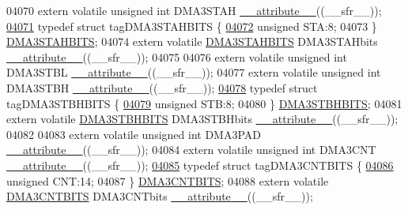 \begin{DoxyCode}
04070 \textcolor{keyword}{extern} \textcolor{keyword}{volatile} \textcolor{keywordtype}{unsigned} \textcolor{keywordtype}{int}  DMA3STAH \hyperlink{a00009_a493c46f03454991ccc5aa7a6e1dfb2a7}{\_\_attribute\_\_}((\_\_sfr\_\_));
\hypertarget{a00009_source_l04071}{}\hyperlink{a00008}{04071} \textcolor{keyword}{typedef} \textcolor{keyword}{struct }tagDMA3STAHBITS \{
\hypertarget{a00009_source_l04072}{}\hyperlink{a00008_a0eec78ddd2c12af678d5fab70fe62d14}{04072}   \textcolor{keywordtype}{unsigned} STA:8;
04073 \} \hyperlink{a00008_dc/df3/a00424}{DMA3STAHBITS};
04074 \textcolor{keyword}{extern} \textcolor{keyword}{volatile} \hyperlink{a00008_dc/df3/a00424}{DMA3STAHBITS} DMA3STAHbits \hyperlink{a00009_a493c46f03454991ccc5aa7a6e1dfb2a7}{\_\_attribute\_\_}((\_\_sfr\_\_));
04075 
04076 \textcolor{keyword}{extern} \textcolor{keyword}{volatile} \textcolor{keywordtype}{unsigned} \textcolor{keywordtype}{int}  DMA3STBL \hyperlink{a00009_a493c46f03454991ccc5aa7a6e1dfb2a7}{\_\_attribute\_\_}((\_\_sfr\_\_));
04077 \textcolor{keyword}{extern} \textcolor{keyword}{volatile} \textcolor{keywordtype}{unsigned} \textcolor{keywordtype}{int}  DMA3STBH \hyperlink{a00009_a493c46f03454991ccc5aa7a6e1dfb2a7}{\_\_attribute\_\_}((\_\_sfr\_\_));
\hypertarget{a00009_source_l04078}{}\hyperlink{a00008}{04078} \textcolor{keyword}{typedef} \textcolor{keyword}{struct }tagDMA3STBHBITS \{
\hypertarget{a00009_source_l04079}{}\hyperlink{a00008_a9bd043a4db27e09b5035a563a8758fe7}{04079}   \textcolor{keywordtype}{unsigned} STB:8;
04080 \} \hyperlink{a00008_dc/d2f/a00425}{DMA3STBHBITS};
04081 \textcolor{keyword}{extern} \textcolor{keyword}{volatile} \hyperlink{a00008_dc/d2f/a00425}{DMA3STBHBITS} DMA3STBHbits \hyperlink{a00009_a493c46f03454991ccc5aa7a6e1dfb2a7}{\_\_attribute\_\_}((\_\_sfr\_\_));
04082 
04083 \textcolor{keyword}{extern} \textcolor{keyword}{volatile} \textcolor{keywordtype}{unsigned} \textcolor{keywordtype}{int}  DMA3PAD \hyperlink{a00009_a493c46f03454991ccc5aa7a6e1dfb2a7}{\_\_attribute\_\_}((\_\_sfr\_\_));
04084 \textcolor{keyword}{extern} \textcolor{keyword}{volatile} \textcolor{keywordtype}{unsigned} \textcolor{keywordtype}{int}  DMA3CNT \hyperlink{a00009_a493c46f03454991ccc5aa7a6e1dfb2a7}{\_\_attribute\_\_}((\_\_sfr\_\_));
\hypertarget{a00009_source_l04085}{}\hyperlink{a00008}{04085} \textcolor{keyword}{typedef} \textcolor{keyword}{struct }tagDMA3CNTBITS \{
\hypertarget{a00009_source_l04086}{}\hyperlink{a00008_a30be39d82c244f19fd98dd74227487f6}{04086}   \textcolor{keywordtype}{unsigned} CNT:14;
04087 \} \hyperlink{a00008_d8/de7/a00417}{DMA3CNTBITS};
04088 \textcolor{keyword}{extern} \textcolor{keyword}{volatile} \hyperlink{a00008_d8/de7/a00417}{DMA3CNTBITS} DMA3CNTbits \hyperlink{a00009_a493c46f03454991ccc5aa7a6e1dfb2a7}{\_\_attribute\_\_}((\_\_sfr\_\_));

\end{DoxyCode}
